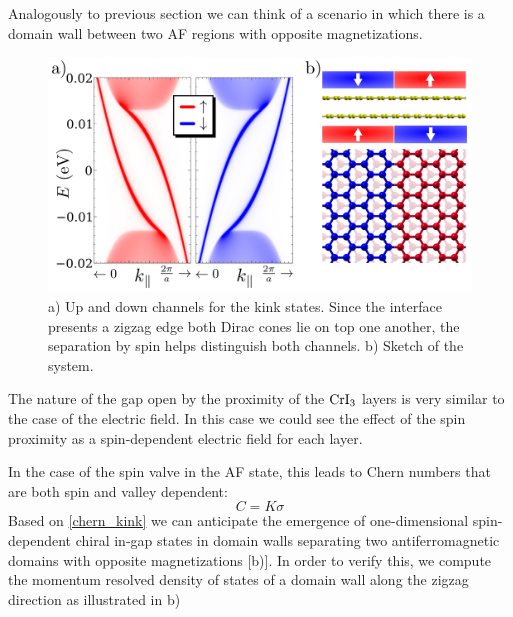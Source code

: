 Analogously to previous section we can think of a scenario in which there is a domain wall between two AF regions with opposite magnetizations.
\begin{figure}[h!]
\centering
\includegraphics{graphene_bilayer/figures/cri3_kink.pdf}
\vspace{-5pt}
\caption{a) Up and down channels for the kink states. Since the interface presents a zigzag edge both Dirac cones lie on top one another, the separation by spin helps distinguish both channels. b) Sketch of the system.}
\label{cri3kink}
\end{figure}



The nature of the gap open by the proximity of the $\ce{CrI_3}$ layers is very similar to the case of the electric field. In this case we could see the effect of the spin proximity as a spin-dependent electric field for each layer.

In the case of the spin valve in the AF state, this leads to Chern numbers that are both spin and valley dependent:
\begin{equation}
C=K\sigma
\label{chern_kink}
\end{equation}
Based on \eqref{chern_kink} we can anticipate\cite{Martin2008,San-Jose2009} the emergence of one-dimensional spin-dependent chiral in-gap states in domain walls separating two antiferromagnetic domains with opposite magnetizations [b)]. In order to verify this, we compute the momentum resolved density of states of a domain wall along the zigzag direction as illustrated in b)

